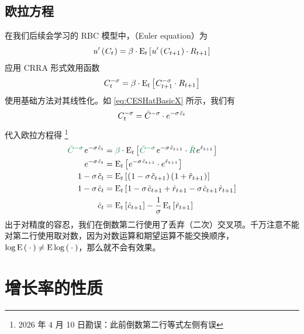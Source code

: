 \subsection{欧拉方程}\label{subsec:exEuler}

在我们后续会学习的 RBC 模型中，（Euler equation）为
\begin{equation}
    u'\left(\mspace{1mu} C_t\mspace{1mu}\right)=\beta\cdot\text{E}_t\left[\mspace{1mu} u'\left(\mspace{1mu} C_{t+1}\mspace{1mu}\right)\cdot R_{t+1}\mspace{1mu}\right]
\end{equation}
应用 CRRA 形式效用函数
\begin{equation}
    C_t^{-\sigma}=\beta\cdot\text{E}_t\left[\mspace{1mu} C_{t+1}^{-\sigma}\cdot R_{t+1}\mspace{1mu}\right]
\end{equation}
使用基础方法对其线性化。如 \ref{eq:CESHatBasicX} 所示，我们有
\begin{equation}
    C_t^{-\sigma}=\bar C^{-\sigma}\cdot e^{-\sigma\,\hat c_t}\notag
\end{equation}
代入欧拉方程得 \footnote{2026 年 4 月 10 日勘误：此前倒数第二行等式左侧有误}
\begin{align}
    \fafugreen{\bar C^{-\sigma}}\,e^{-\sigma\,\hat c_t}&=\fafugreen{\beta}\cdot\mean_t\bks{\fafugreen{\bar C^{-\sigma}}\,e^{-\sigma\,\hat c\nt}\cdot \fafugreen{\bar R}\,e^{\hat r\nt}}\notag\\
    e^{-\sigma\,\hat c_t}&=\mean_t\bks{e^{-\sigma\,\hat c\nt}\cdot e^{\hat r\nt}}\notag\\
    1-\sigma\,\hat c_t&=\mean_t\bks{\bka{1-\sigma\,\hat c\nt}\bka{1+\hat r\nt}}\notag\\
    1-\sigma\,\hat c_t&=\mean_t\bks{1-\sigma\,\hat c\nt+\hat r\nt-\sigma\,\hat c\nt\,\hat r\nt}\notag\\
    \hat c_t&=\mean_t\bks{\hat c\nt}-\dfrac1\sigma\,\mean_t\bks{\hat r\nt}
\end{align}
出于对精度的容忍，我们在倒数第二行使用了丢弃（二次）交叉项。千万注意不能对第二行使用取对数，因为对数运算和期望运算不能交换顺序，\(\log\mean\bka\abfun\ne\mean\log\bka\abfun\)，那么就不会有效果。

\BeginChapterAppendix

\section{增长率的性质}\label{sec:GrowRateProp}


